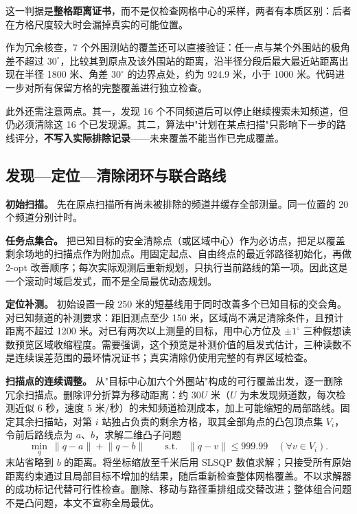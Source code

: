 这一判据是\textbf{整格距离证书}，而不是仅检查网格中心的采样，两者有本质区别：后者在方格尺度较大时会漏掉真实的可能位置。

作为冗余核查，7 个外围测站的覆盖还可以直接验证：任一点与某个外围站的极角差不超过 $30^\circ$，比较其到原点及该外围站的距离，沿半径分段后最大最近站距离出现在半径 1800 米、角差 $30^\circ$ 的边界点处，约为 924.9 米，小于 1000 米。代码进一步对所有保留方格的完整覆盖进行独立检查。

此外还需注意两点。其一，发现 16 个不同频道后可以停止继续搜索未知频道，但仍必须清除这 16 个已发现源。其二，算法中"计划在某点扫描"只影响下一步的路线评分，\textbf{不写入实际排除记录}——未来覆盖不能当作已完成覆盖。

\subsection{发现—定位—清除闭环与联合路线}

\textbf{初始扫描。} 先在原点扫描所有尚未被排除的频道并缓存全部测量。同一位置的 20 个频道分别计时。

\textbf{任务点集合。} 把已知目标的安全清除点（或区域中心）作为必访点，把足以覆盖剩余场地的扫描点作为附加点。用固定起点、自由终点的最近邻路径初始化，再做 2-opt 改善顺序；每次实际观测后重新规划，只执行当前路线的第一项。因此这是一个滚动时域启发式，而不是全局最优动态规划。

\textbf{定位补测。} 初始设置一段 250 米的短基线用于同时改善多个已知目标的交会角。对已知频道的补测要求：距旧测点至少 150 米，区域尚不满足清除条件，且预计距离不超过 1200 米。对已有两次以上测量的目标，用中心方位及 $\pm1^\circ$ 三种假想读数预览区域收缩程度。需要强调，这个预览是补测价值的启发式估计，三种读数不是连续误差范围的最坏情况证书；真实清除仍使用完整的有界区域检查。

\textbf{扫描点的连续调整。} 从"目标中心加六个外圈站"构成的可行覆盖出发，逐一删除冗余扫描点。删除评分折算为移动距离：约 $30U$ 米（$U$ 为未发现频道数，每次检测近似 6 秒，速度 5 米/秒）的未知频道检测成本，加上可能缩短的局部路线。固定其余扫描站，对第 $i$ 站独占负责的剩余方格，取其全部角点的凸包顶点集 $V_i$，令前后路线点为 $a$、$b$，求解二维凸子问题
\begin{equation}
  \min_q\ \lVert q-a\rVert+\lVert q-b\rVert
  \qquad\text{s.t.}\quad \lVert q-v\rVert\le999.99\quad(\forall v\in V_i).
  \label{eq:scan-relocate}
\end{equation}
末站省略到 $b$ 的距离。将坐标缩放至千米后用 SLSQP 数值求解；只接受所有原始距离约束通过且局部目标不增加的结果，随后重新检查整体网格覆盖。不以求解器的成功标记代替可行性检查。删除、移动与路径重排组成交替改进；整体组合问题不是凸问题，本文不宣称全局最优。

